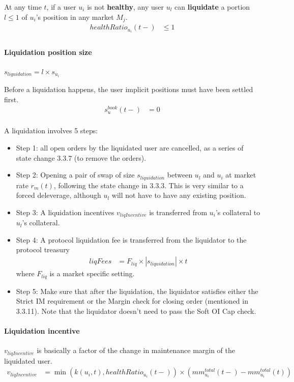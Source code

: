 \documentclass{article}%
\begin{document}
At any time $t$, if a user $u_i$ is not \textbf{healthy}, any user $u_l$ can \textbf{liquidate} a portion $l \leq 1$ of $u_i$'s position in any market $M_j$.
    \begin{align*}
        healthRatio_{u_i}(t-) &\leq 1\\
    \end{align*}

\paragraph{Liquidation position size} $s_{liquidation} = l \times s_{u_i}$ 

Before a liquidation happens, the user implicit positions must have been settled first. 
    \begin{align*}
        s_u^{book}(t-) &= 0\\
    \end{align*}

A liquidation involves 5 steps:
\begin{itemize}
    \item Step 1: all open orders by the liquidated user are cancelled, as a series of state change 3.3.7 (to remove the orders).
    \item Step 2: Opening a pair of swap of size $s_{liquidation}$ between $u_l$ and $u_i$ at market rate $r_m(t)$, following the state change in 3.3.3. This is very similar to a forced deleverage, although $u_l$ will not have to have any existing position.
    \item Step 3: A liquidation incentives $v_{liqIncentive}$ is transferred from $u_i$'s collateral to $u_l$'s collateral.
    \item Step 4: A protocol liquidation fee is transferred from the liquidator to the protocol treasury
    \begin{align*}
         liqFees &= F_{liq} \times | s_{liquidation} | \times t
    \end{align*}
    where $F_{liq}$ is a market specific setting.
    \item Step 5: Make sure that after the liquidation, the liquidator satisfies either the Strict IM requirement or the Margin check for closing order (mentioned in 3.3.11). Note that the liquidator doesn't need to pass the Soft OI Cap check.
\end{itemize}

\paragraph{Liquidation incentive} $v_{liqIncentive}$ is basically a factor of the change in maintenance margin of the liquidated user.
    \begin{align*}
        v_{liqIncentive} &= \min(k(u_i, t), healthRatio_{u_i}(t-)) \times (mm_{u_i}^{total}(t-) - mm_{u_i}^{total}(t))
    \end{align*}
\end{document}

